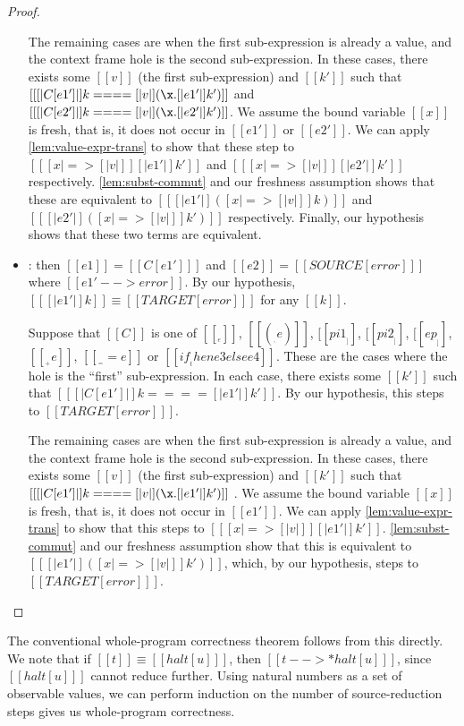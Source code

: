 \documentclass[11pt]{article}
\newcommand{\rrule}[1]{\rref*{#1}}
\begin{document}
\begin{proof}
\begin{itemize}
		The remaining cases are when the first sub-expression is already a value, and the context frame hole is the second sub-expression.
		In these cases, there exists some $[[v]]$ (the first sub-expression) and $[[k']]$
		such that $[[ [|C[e1'] |]k ==== [|v|](\x . [|e1'|]k' ) ]]$ and $[[ [|C[e2'] |]k ==== [|v|](\x . [|e2'|]k' ) ]]$.
		We assume the bound variable $[[x]]$ is fresh, that is, it does not occur in $[[e1']]$ or $[[e2']]$.
		We can apply \autoref{lem:value-expr-trans} to show that these step to $[[ [x |=> [|v|] ][|e1'|]k' ]]$
		and $[[ [x |=> [|v|] ][|e2'|]k' ]]$ respectively. \autoref{lem:subst-commut} and our freshness assumption 
		shows that these are equivalent to
		$[[ [| e1' |]( [x |=> [|v|] ]k ) ]]$ and $[[ [| e2' |]([x |=> [|v|] ]k') ]]$ respectively.
		Finally, our hypothesis shows that these two terms are equivalent.

		\item \rrule{RedContextFail}: then $[[e1]]=[[C[e1'] ]] $ and $[[e2]]=[[SOURCE[error] ]] $ where $[[e1' --> error]]$.
		By our hypothesis, $[[ [|e1'|]k ]] \equiv [[ TARGET[error] ]]$ for any $[[k]]$.

		Suppose that $[[C]]$ is one of $[[ __ e]]$, $[[(__, e)]]$, $[[pi1 __]]$, $[[pi2 __]]$, $[[ep __]]$,
		$[[__ + e]]$, $[[__ == e]]$ or $[[if __ then e3 else e4]]$. These are the cases where the hole is the ``first''
		sub-expression. 
		In each case, there exists some $[[k']]$ such that $[[ [|C[e1'] |]k ==== [|e1'|]k' ]]$. By our hypothesis,
		this steps to $[[ TARGET[error] ]]$.

		
		The remaining cases are when the first sub-expression is already a value, and the context frame hole is the second sub-expression.
		In these cases, there exists some $[[v]]$ (the first sub-expression) and $[[k']]$
		such that $[[ [|C[e1'] |]k ==== [|v|](\x . [|e1'|]k' ) ]]$ .
		We assume the bound variable $[[x]]$ is fresh, that is, it does not occur in $[[e1']]$.
		We can apply \autoref{lem:value-expr-trans} to show that this steps to $[[ [x |=> [|v|] ][|e1'|]k' ]]$.
		 \autoref{lem:subst-commut} and our freshness assumption 
		show that this is equivalent to
		$[[ [| e1' |]([x |=> [|v|] ]k') ]]$, which, by our hypothesis,
		steps to $[[ TARGET[error] ]]$.
		

		  
	\end{itemize}
\end{proof}

The conventional whole-program correctness theorem follows from this directly.
We note that if $[[t]]\equiv[[ halt[u] ]]$, then $[[t -->* halt[u] ]]$,
since $[[ halt[u] ]]$ cannot reduce further. 
Using natural numbers as a set of observable values,
we can perform induction on the number of source-reduction steps gives us whole-program correctness.
\end{document}
